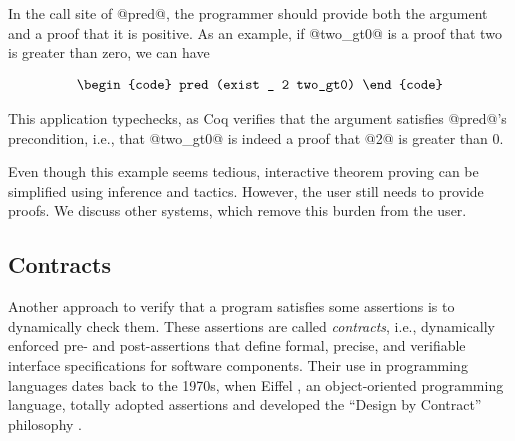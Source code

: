 \begin{comment}
where zgtz

\begin{verbatim}
Lemma zgtz : 0 > 0 -> False.
  crush.
Qed.

Inductive eq (A:Type) (x:A) : A -> Prop :=
    eq_refl : x = x :>A
\end{verbatim}
\end{comment}

In the call site of @pred@, the programmer should provide
both the argument and a proof that it is positive.
As an example,
if @two_gt0@ is a proof that two is greater than zero, we can have

$$\centering
\begin{tabular}{c}
\begin{code}
pred (exist _ 2 two_gt0)
\end{code}
\end{tabular}
$$
 
This application typechecks, as Coq verifies that 
the argument satisfies @pred@'s precondition, i.e., that  
@two_gt0@ is indeed a proof that @2@ is greater than 0. 

\begin{comment}
Theorem two_gt0 : 2 > 0.
  crush.
Qed.
\end{comment}

Even though this example seems tedious, 
interactive theorem proving can be simplified
using inference and tactics. 
%
However, the user still needs to provide proofs.
%
We discuss other systems, which remove this burden from the user.

\subsection{Contracts}
Another approach to verify that a program satisfies some 
assertions is to dynamically check them.
% 
These assertions are called \textit{contracts}, i.e., 
dynamically enforced pre- and post-assertions that
define formal, precise, and verifiable interface specifications 
for software components.
%	
Their use in programming languages dates back to the 1970s,
when Eiffel \cite{Eiffel}, an object-oriented programming language,
totally adopted assertions and developed the 
``Design by Contract'' philosophy \cite{Meyer92}.

